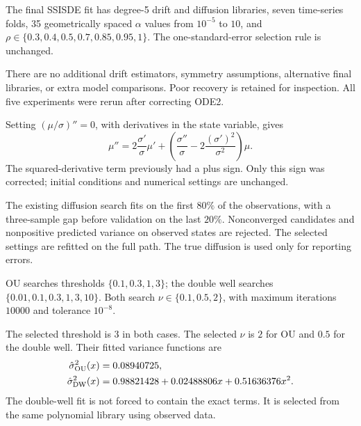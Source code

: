\documentclass[10pt,letterpaper]{article}
\newcommand{\heading}[1]{\vspace{5pt}{\large\bfseries\color{accent}#1}\par}
\begin{document}
The final SSISDE fit has degree-5 drift and diffusion libraries, seven time-series folds, 35 geometrically spaced $\alpha$ values from $10^{-5}$ to $10$, and $\rho\in\{0.3,0.4,0.5,0.7,0.85,0.95,1\}$. The one-standard-error selection rule is unchanged.

There are no additional drift estimators, symmetry assumptions, alternative final libraries, or extra model comparisons. Poor recovery is retained for inspection. All five experiments were rerun after correcting ODE2.

Setting $(\mu/\sigma)''=0$, with derivatives in the state variable, gives
\[
\mu''=2\frac{\sigma'}{\sigma}\mu'
+\left(\frac{\sigma''}{\sigma}-2\frac{(\sigma')^2}{\sigma^2}\right)\mu.
\]
The squared-derivative term previously had a plus sign. Only this sign was corrected; initial conditions and numerical settings are unchanged.

\newpage
\heading{3. Diffusion tuning}
The existing diffusion search fits on the first $80\%$ of the observations, with a three-sample gap before validation on the last $20\%$. Nonconverged candidates and nonpositive predicted variance on observed states are rejected. The selected settings are refitted on the full path. The true diffusion is used only for reporting errors.

OU searches thresholds $\{0.1,0.3,1,3\}$; the double well searches $\{0.01,0.1,0.3,1,3,10\}$. Both search $\nu\in\{0.1,0.5,2\}$, with maximum iterations $10000$ and tolerance $10^{-8}$.

The selected threshold is $3$ in both cases. The selected $\nu$ is $2$ for OU and $0.5$ for the double well. Their fitted variance functions are
\begin{align*}
\hat\sigma^2_{\rm OU}(x)&=0.08940725,\\
\hat\sigma^2_{\rm DW}(x)&=0.98821428+0.02488806x+0.51636376x^2.
\end{align*}
The double-well fit is not forced to contain the exact terms. It is selected from the same polynomial library using observed data.
\end{document}
